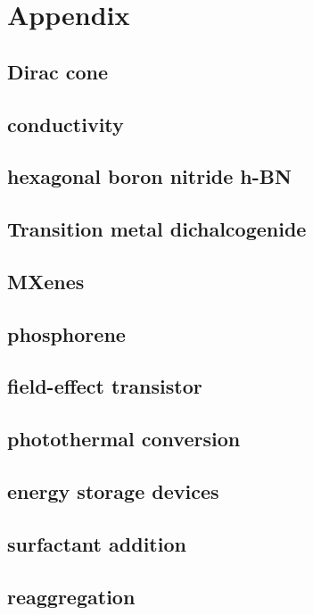 \documentclass[a4paper, 11pt]{article}
\numberwithin{equation}{subsection}
\begin{document}
\section{Appendix}

\subsection{Dirac cone}

\subsection{conductivity}

\subsection{hexagonal boron nitride h-BN}

\subsection{Transition metal dichalcogenide}

\subsection{MXenes}

\subsection{phosphorene}

\subsection{field-effect transistor}

\subsection{photothermal conversion}

\subsection{energy storage devices}

\subsection{surfactant addition}

\subsection{reaggregation}


\newpage

\end{document}
